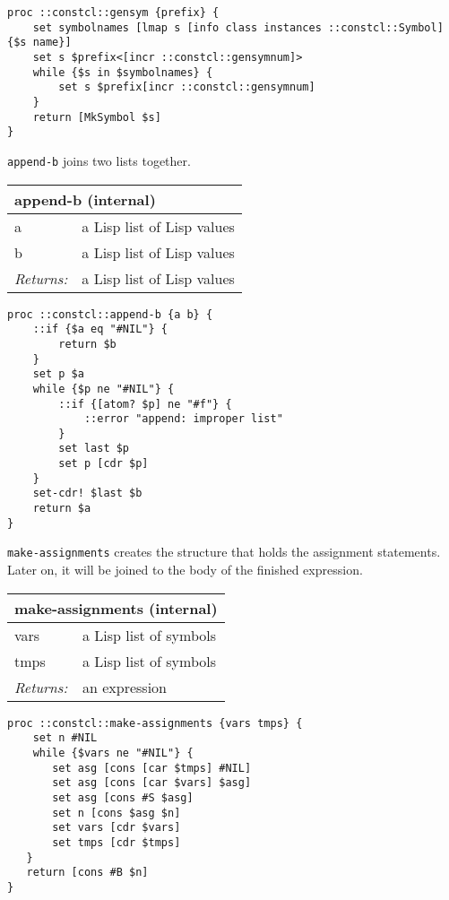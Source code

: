 \documentclass{report}
\begin{document}
\noindent\makebox[\linewidth]{\rule{\linewidth}{0.4pt}}
\begin{lstlisting}
proc ::constcl::gensym {prefix} {
    set symbolnames [lmap s [info class instances ::constcl::Symbol] {$s name}]
    set s $prefix<[incr ::constcl::gensymnum]>
    while {$s in $symbolnames} {
        set s $prefix[incr ::constcl::gensymnum]
    }
    return [MkSymbol $s]
}
\end{lstlisting}
\noindent\makebox[\linewidth]{\rule{\linewidth}{0.4pt}}

\texttt{append-b} joins two lists together.

\begin{tabular}{ |l l| }
\hline
\multicolumn{2}{|l|}{append-b (internal)} \\
\hline
a & a Lisp list of Lisp values \\
b & a Lisp list of Lisp values \\
\textit{Returns:} & a Lisp list of Lisp values \\
\hline
\end{tabular}

\noindent\makebox[\linewidth]{\rule{\linewidth}{0.4pt}}
\begin{lstlisting}
proc ::constcl::append-b {a b} {
    ::if {$a eq "#NIL"} {
        return $b
    }
    set p $a
    while {$p ne "#NIL"} {
        ::if {[atom? $p] ne "#f"} {
            ::error "append: improper list"
        }
        set last $p
        set p [cdr $p]
    }
    set-cdr! $last $b
    return $a
}
\end{lstlisting}
\noindent\makebox[\linewidth]{\rule{\linewidth}{0.4pt}}

\texttt{make-assignments} creates the structure that holds the assignment statements. Later on, it will be joined to the body of the finished expression.

\begin{tabular}{ |l l| }
\hline
\multicolumn{2}{|l|}{make-assignments (internal)} \\
\hline
vars & a Lisp list of symbols \\
tmps & a Lisp list of symbols \\
\textit{Returns:} & an expression \\
\hline
\end{tabular}

\noindent\makebox[\linewidth]{\rule{\linewidth}{0.4pt}}
\begin{lstlisting}
proc ::constcl::make-assignments {vars tmps} {
    set n #NIL
    while {$vars ne "#NIL"} {
       set asg [cons [car $tmps] #NIL]
       set asg [cons [car $vars] $asg]
       set asg [cons #S $asg]
       set n [cons $asg $n]
       set vars [cdr $vars]
       set tmps [cdr $tmps]
   }
   return [cons #B $n]
}
\end{lstlisting}
\noindent\makebox[\linewidth]{\rule{\linewidth}{0.4pt}}
\end{document}
